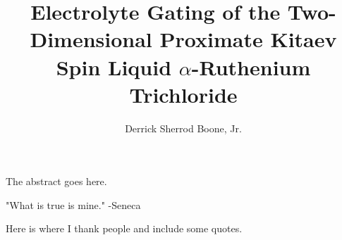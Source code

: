 \documentclass[12pt]{report}
\title{Electrolyte Gating of the Two-Dimensional Proximate
            Kitaev Spin Liquid $\alpha$-Ruthenium Trichloride}
\author{Derrick Sherrod Boone, Jr.}
\begin{document}

    \beforepreface


        The abstract goes here.

\newpage

"What is true is mine." -Seneca

        Here is where I thank people and include some quotes.

    \afterpreface
 
 







\end{document}
